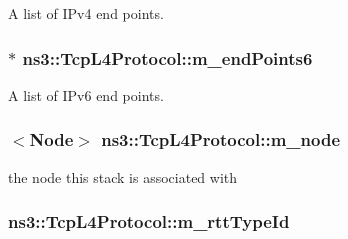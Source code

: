 A list of I\+Pv4 end points. 

\subsubsection[{\texorpdfstring{m\+\_\+end\+Points6}{m_endPoints6}}]{$\ast$ ns3\+::\+Tcp\+L4\+Protocol\+::m\+\_\+end\+Points6\hspace{0.3cm}{\ttfamily [private]}}\hypertarget{classns3_1_1TcpL4Protocol_a88deacf73247133fccfe64179ad665e3}{}\label{classns3_1_1TcpL4Protocol_a88deacf73247133fccfe64179ad665e3}


A list of I\+Pv6 end points. 

\subsubsection[{\texorpdfstring{m\+\_\+node}{m_node}}]{$<${\bf Node}$>$ ns3\+::\+Tcp\+L4\+Protocol\+::m\+\_\+node\hspace{0.3cm}{\ttfamily [private]}}\hypertarget{classns3_1_1TcpL4Protocol_a89e39fd5367f8ce22565f69e224de189}{}\label{classns3_1_1TcpL4Protocol_a89e39fd5367f8ce22565f69e224de189}


the node this stack is associated with 

\subsubsection[{\texorpdfstring{m\+\_\+rtt\+Type\+Id}{m_rttTypeId}}]{ ns3\+::\+Tcp\+L4\+Protocol\+::m\+\_\+rtt\+Type\+Id\hspace{0.3cm}{\ttfamily [private]}}\hypertarget{classns3_1_1TcpL4Protocol_aff3e46318717dcbce5f222e94b8345cd}{}\label{classns3_1_1TcpL4Protocol_aff3e46318717dcbce5f222e94b8345cd}


